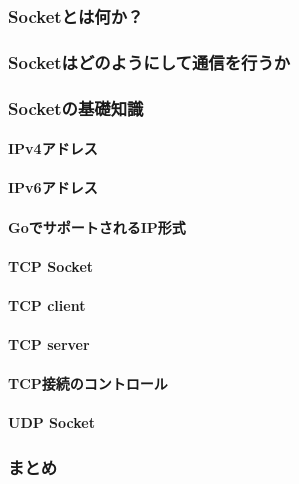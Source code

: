 
\subsubsection{Socketとは何か？}

\subsubsection{Socketはどのようにして通信を行うか}

\subsubsection{Socketの基礎知識}

\paragraph{IPv4アドレス}

\paragraph{IPv6アドレス}

\paragraph{GoでサポートされるIP形式}

\paragraph{TCP Socket}

\paragraph{TCP client}

\paragraph{TCP server}

\paragraph{TCP接続のコントロール}

\paragraph{UDP Socket}

\subsubsection{まとめ}

